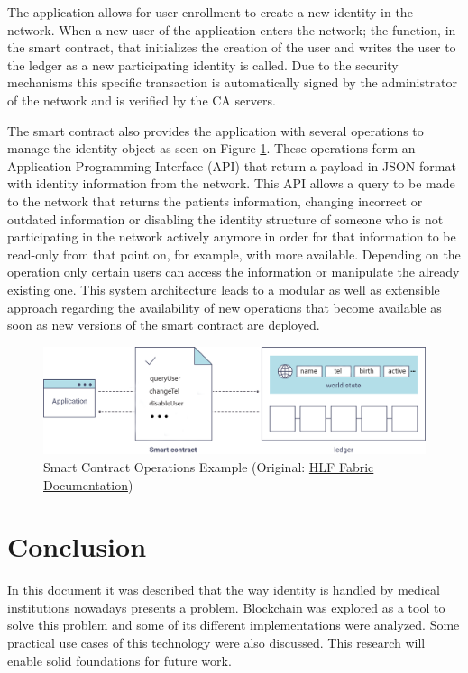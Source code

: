 \documentclass[]{llncs}
\begin{document}
The application allows for user enrollment to create a new identity in the
network.  When a new user of the application enters the network; the function,
in the smart contract, that initializes the creation of the user and writes the
user to the ledger as a new participating identity is called. Due to the
security mechanisms this specific transaction is automatically signed by the
administrator of the network and is verified by the CA servers.

The smart contract also provides the application with several operations to
manage the identity object as seen on Figure \ref{fig:smartContractOverview}.
These operations form an Application Programming Interface (API) that return a
payload in JSON format with identity information from the network.  This API
allows a query to be made to the network that returns the patients information,
changing incorrect or outdated information or disabling the identity structure
of someone who is not participating in the network actively anymore in order
for that information to be read-only from that point on, for example, with more
available.  Depending on the operation only certain users can access the
information or manipulate the already existing one.  This system architecture
leads to a modular as well as extensible approach regarding the availability of
new operations that become available as soon as new versions of the smart
contract are deployed.  \begin{figure}[ht] \centering
\includegraphics[width=1\linewidth]{images/smartContractOverview.png}
\caption{\label{fig:smartContractOverview}Smart Contract Operations Example
(Original:
\href{http://hyperledger-fabric.readthedocs.io/en/latest/write_first_app.html}{HLF
Fabric Documentation})} \end{figure} \newpage

\section{Conclusion} \label{conclusion} In this document it was described that
the way identity is handled by medical institutions nowadays presents a
problem. Blockchain was explored as a tool to solve this problem and some of
its different implementations were analyzed. Some practical use cases of this
technology were also discussed.  This research will enable solid foundations
for future work.
\end{document}
